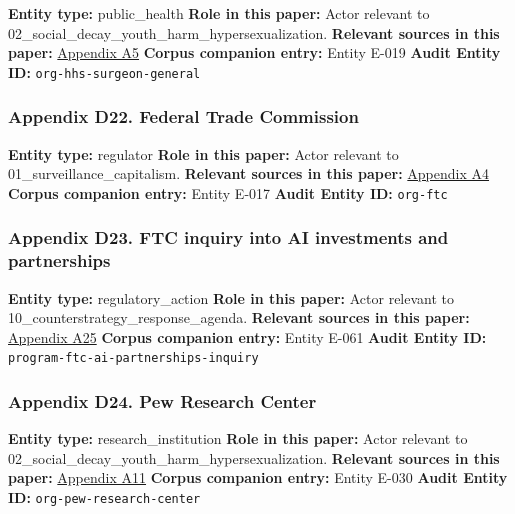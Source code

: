 \documentclass[
  american,
  11pt,
  letterpaper,
]{article}
\begin{document}
\textbf{Entity type:} public\_health \textbf{Role in this paper:} Actor
relevant to 02\_social\_decay\_youth\_harm\_hypersexualization.
\textbf{Relevant sources in this paper:}
\hyperref[appendix-a5-social-media-and-youth-mental-health-the-u-s-surgeon-general-s-advisory]{Appendix
A5} \textbf{Corpus companion entry:} Entity E-019 \textbf{Audit Entity
ID:} \texttt{org-hhs-surgeon-general}

\subsubsection{Appendix D22. Federal Trade
Commission}\label{appendix-d22-federal-trade-commission}

\textbf{Entity type:} regulator \textbf{Role in this paper:} Actor
relevant to 01\_surveillance\_capitalism. \textbf{Relevant sources in
this paper:}
\hyperref[appendix-a4-a-look-behind-the-screens-examining-the-data-practices-of-social-media-and-video-streaming-services]{Appendix
A4} \textbf{Corpus companion entry:} Entity E-017 \textbf{Audit Entity
ID:} \texttt{org-ftc}

\subsubsection{Appendix D23. FTC inquiry into AI investments and
partnerships}\label{appendix-d23-ftc-inquiry-into-ai-investments-and-partnerships}

\textbf{Entity type:} regulatory\_action \textbf{Role in this paper:}
Actor relevant to 10\_counterstrategy\_response\_agenda.
\textbf{Relevant sources in this paper:}
\hyperref[appendix-a25-ftc-opens-inquiry-into-big-tech-s-partnerships-with-leading-ai-startups]{Appendix
A25} \textbf{Corpus companion entry:} Entity E-061 \textbf{Audit Entity
ID:} \texttt{program-ftc-ai-partnerships-inquiry}

\subsubsection{Appendix D24. Pew Research
Center}\label{appendix-d24-pew-research-center}

\textbf{Entity type:} research\_institution \textbf{Role in this paper:}
Actor relevant to 02\_social\_decay\_youth\_harm\_hypersexualization.
\textbf{Relevant sources in this paper:}
\hyperref[appendix-a11-social-media-seen-as-mostly-good-for-democracy-across-many-nations-but-u-s-is-a-major-outlier]{Appendix
A11} \textbf{Corpus companion entry:} Entity E-030 \textbf{Audit Entity
ID:} \texttt{org-pew-research-center}
\end{document}

